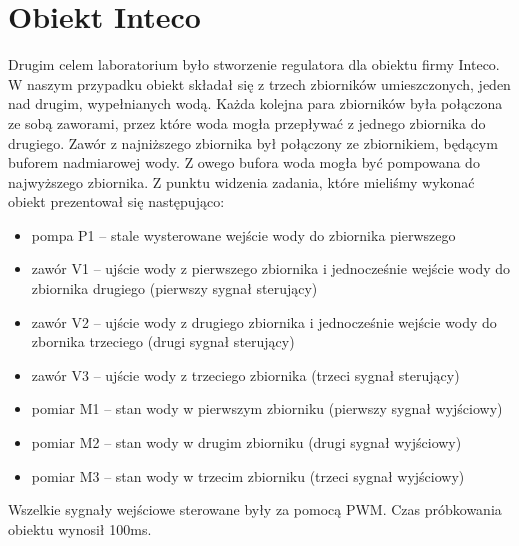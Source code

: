 \section{Obiekt Inteco}
\label{sec:inteco}
Drugim celem laboratorium było stworzenie regulatora dla obiektu firmy Inteco.
W naszym przypadku obiekt składał się z trzech zbiorników umieszczonych,
jeden nad drugim, wypełnianych wodą. Każda kolejna para zbiorników była
połączona ze sobą zaworami, przez które woda mogła przepływać z jednego
zbiornika do drugiego. Zawór z najniższego zbiornika był połączony ze zbiornikiem,
będącym buforem nadmiarowej wody. Z owego bufora woda mogła być pompowana do
najwyższego zbiornika. Z punktu widzenia zadania, które mieliśmy wykonać
obiekt prezentował się następująco:
\begin{itemize}
  \item pompa P1 -- stale wysterowane wejście wody do zbiornika pierwszego
  \item zawór V1 -- ujście wody z pierwszego zbiornika i
  jednocześnie wejście wody do zbiornika drugiego (pierwszy sygnał sterujący)
  \item zawór V2 -- ujście wody z drugiego zbiornika i jednocześnie wejście
  wody do zbornika trzeciego (drugi sygnał sterujący)
  \item zawór V3 -- ujście wody z trzeciego zbiornika (trzeci sygnał sterujący)
  \item pomiar M1 -- stan wody w pierwszym zbiorniku (pierwszy sygnał wyjściowy)
  \item pomiar M2 -- stan wody w drugim zbiorniku (drugi sygnał wyjściowy)
  \item pomiar M3 -- stan wody w trzecim zbiorniku (trzeci sygnał wyjściowy)
\end{itemize}
Wszelkie sygnały wejściowe sterowane były za pomocą PWM. Czas próbkowania obiektu
wynosił 100ms.
